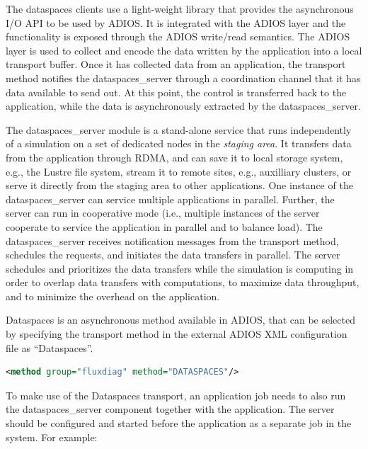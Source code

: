 The dataspaces clients use a light-weight library that provides the asynchronous
I/O API to be used by ADIOS. It is integrated with the ADIOS layer and the
functionality is exposed through the ADIOS write/read semantics. 
The ADIOS layer is used to collect and encode the data written 
by the application into a local transport buffer. Once it has collected data from 
an application, the transport method notifies the dataspaces\_server through a coordination channel 
that it has data available to send out. At this point, the control is
transferred back to the application, while the data is asynchronously extracted 
by the dataspaces\_server.

The dataspaces\_server module is a stand-alone service that runs independently of a simulation 
on a set of dedicated nodes in the 
{\em staging area}. It transfers data from the application through RDMA,  
and can save it to local storage system, e.g., the Lustre file system, stream it to 
remote sites, e.g., auxilliary clusters, or serve it directly from the staging area to 
other applications. One instance of the dataspaces\_server can service multiple applications 
 in parallel. Further, the server can run in cooperative mode (i.e., multiple 
instances of the server cooperate to service the application in parallel and to balance 
load). The dataspaces\_server receives notification messages from the transport method, schedules 
the requests, and initiates the data transfers  in parallel. The 
server schedules and prioritizes the data transfers while the simulation is computing 
in order to overlap data transfers with computations, to maximize data throughput, 
and to minimize the overhead on the application.

Dataspaces is an asynchronous method available in ADIOS, that can be selected by specifying 
the transport method in the external ADIOS XML configuration file as ``Dataspaces''.

\begin{lstlisting}[language=XML, caption=Select Dataspaces as a transport method in the configuration file example.]
<method group="fluxdiag" method="DATASPACES"/>
\end{lstlisting}

To make use of the Dataspaces transport, an application job needs to also run the dataspaces\_server 
component together with the application. The server should be configured and started 
before the application as a separate job in the system. For example:

